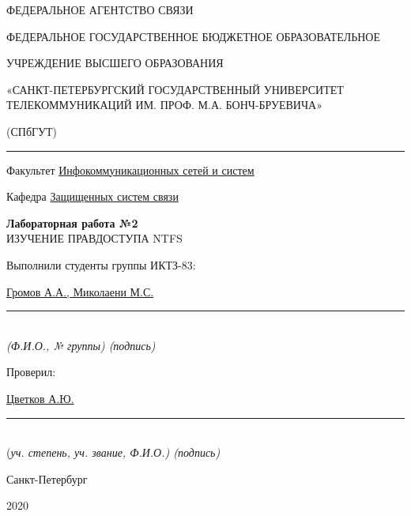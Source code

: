 \documentclass[a4paper,14pt]{extarticle}
\begin{document}
    \begin{center}
        \thispagestyle{empty}
        \begin{singlespace}
        ФЕДЕРАЛЬНОЕ АГЕНТСТВО СВЯЗИ

        ФЕДЕРАЛЬНОЕ ГОСУДАРСТВЕННОЕ БЮДЖЕТНОЕ ОБРАЗОВАТЕЛЬНОЕ

        УЧРЕЖДЕНИЕ ВЫСШЕГО ОБРАЗОВАНИЯ

        «САНКТ-ПЕТЕРБУРГСКИЙ ГОСУДАРСТВЕННЫЙ УНИВЕРСИТЕТ ТЕЛЕКОММУНИКАЦИЙ ИМ. ПРОФ. М.А. БОНЧ-БРУЕВИЧА»

        (СПбГУТ)
        \end{singlespace}
        \vspace{-1ex}
        \rule{\textwidth}{0.4pt}
        \vspace{-5ex}

        Факультет \underline{Инфокоммуникационных сетей и систем}

        Кафедра \underline{Защищенных систем связи}
        \vspace{10ex}

        \textbf{Лабораторная работа №2}\\
        ИЗУЧЕНИЕ ПРАВДОСТУПА NTFS 


    \end{center}
    \vspace{4ex}
    \begin{flushright}
    \parbox{10 cm}{
    \begin{flushleft}
        Выполнили студенты группы ИКТЗ-83:

        \underline{Громов А.А., Миколаени М.С.} \hfill \rule[-0.85ex]{0.1\textwidth}{0.6pt}\\
        \vspace{-1ex}
        \footnotesize \textit{ (Ф.И.О., № группы) \hfill (подпись)} \normalsize

        Проверил:

        \underline{Цветков А.Ю.} \hfill \rule[-0.85ex]{0.1\textwidth}{0.6pt}\\
        \vspace{-1ex}
        (\footnotesize \textit{уч. степень, уч. звание, Ф.И.О.) \hfill (подпись)} \normalsize

    \end{flushleft}
    }
    \end{flushright}
    \begin{center}
        \vfill
        Санкт-Петербург

        2020

    \end{center}
    \newpage
\end{document}
